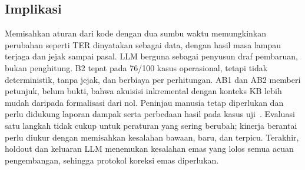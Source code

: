 \documentclass[conference]{IEEEtran}
\makeatletter
\DeclareRobustCommand{\en}[1]{{\usefont{\f@encoding}{\f@family}{\f@series}{it}#1\/}}
\makeatother
\begin{document}
\subsection{Implikasi}
Memisahkan aturan dari kode dengan dua sumbu waktu memungkinkan perubahan seperti TER dinyatakan sebagai data, dengan hasil masa lampau terjaga dan jejak sampai pasal. LLM berguna sebagai penyusun draf pembaruan, bukan penghitung. B2 tepat pada 76/100 kasus operasional, tetapi tidak deterministik, tanpa jejak, dan berbiaya per perhitungan. AB1 dan AB2 memberi petunjuk, belum bukti, bahwa akuisisi inkremental dengan konteks KB lebih mudah daripada formalisasi dari nol. Peninjau manusia tetap diperlukan dan perlu didukung laporan dampak serta perbedaan hasil pada kasus uji~\cite{enqvist2023oversight,green2022oversight}. Evaluasi satu langkah tidak cukup untuk peraturan yang sering berubah; kinerja berantai perlu diukur dengan memisahkan kesalahan bawaan, baru, dan terpicu. Terakhir, \en{holdout} dan keluaran LLM menemukan kesalahan emas yang lolos semua acuan pengembangan, sehingga protokol koreksi emas diperlukan.
\end{document}
